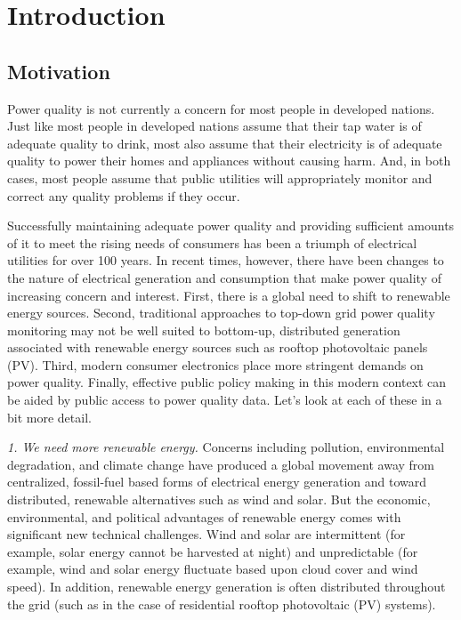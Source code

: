 \section{Introduction}


\subsection{Motivation}

Power quality is not currently a concern for most people in developed nations. Just like most people in developed nations assume that their tap water is of adequate quality to drink, most also assume that their electricity is of adequate quality to power their homes and appliances without causing harm. And, in both cases, most people assume that public utilities will appropriately monitor and correct any quality problems if they occur.

Successfully maintaining adequate power quality and providing sufficient amounts of it to meet the rising needs of consumers has been a triumph of electrical utilities for over 100 years. In recent times, however, there have been changes to the nature of electrical generation and consumption that make power quality of increasing concern and interest. First, there is a global need to shift to renewable energy sources. Second, traditional approaches to top-down grid power quality monitoring may not be well suited to bottom-up, distributed generation associated with renewable energy sources such as rooftop photovoltaic panels (PV). Third, modern consumer electronics place more stringent demands on power quality.  Finally, effective public policy making in this modern context can be aided by public access to power quality data.  Let's look at each of these in a bit more detail.

{\em 1. We need more renewable energy.} Concerns including pollution, environmental degradation, and climate change have produced a global movement away from centralized, fossil-fuel based forms of electrical energy generation and toward distributed, renewable alternatives such as wind and solar. But the economic, environmental, and political advantages of renewable energy comes with significant new technical challenges. Wind and solar are intermittent (for example, solar energy cannot be harvested at night) and unpredictable (for example, wind and solar energy fluctuate based upon cloud cover and wind speed). In addition, renewable energy generation is often distributed throughout the grid (such as in the case of residential rooftop photovoltaic (PV) systems).

